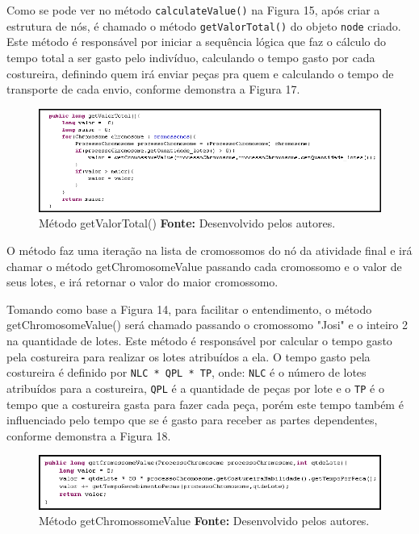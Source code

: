 \par Como se pode ver no método \texttt{calculateValue()} na Figura 15, após
criar a estrutura de nós, é chamado o método \texttt{getValorTotal()} do objeto
\texttt{node} criado. Este método é responsável por iniciar a sequência lógica que faz o cálculo do tempo total a ser gasto pelo indivíduo, calculando o tempo gasto por cada costureira, definindo quem irá enviar
peças pra quem e calculando o tempo de transporte de cada envio, conforme demonstra a Figura 17.

\begin{figure}[h!]
	\centerline{\includegraphics[scale=0.8]{./imagens/metodo_getValorTotal.png}}
	\caption[Distribuição de trabalho]
	{Método getValorTotal() \textbf{Fonte:} Desenvolvido pelos autores.}
	\label{fig:exemplo1}
\end{figure}

\par O método faz uma iteração na lista de cromossomos do nó da atividade final e irá chamar o método getChromosomeValue passando 
cada cromossomo e o valor de seus lotes, e irá retornar o valor do maior cromossomo.

\par Tomando como base a Figura 14, para facilitar o entendimento, o método getChromosomeValue()
será chamado passando o cromossomo "Josi" e o inteiro 2 na quantidade de lotes. Este método é responsável por calcular o tempo gasto 
pela costureira para realizar os lotes atribuídos a ela. O tempo gasto pela
costureira é definido por \texttt{NLC * QPL * TP}, onde: \texttt{NLC} é o número
de lotes atribuídos para a costureira, \texttt{QPL} é a quantidade de peças por
lote e o \texttt{TP} é o tempo que a costureira gasta para fazer cada peça, porém este tempo também é influenciado pelo tempo que se é gasto para receber as partes dependentes, conforme demonstra a Figura 18.

\begin{figure}[h!]
	\centerline{\includegraphics[scale=0.8]{./imagens/metodo_getCromossomeValue.png}}
	\caption[Distribuição de trabalho]
	{Método getChromossomeValue \textbf{Fonte:} Desenvolvido pelos autores.}
	\label{fig:exemplo1}
\end{figure}

